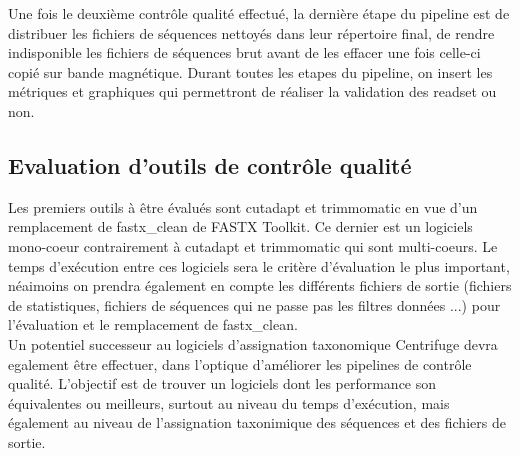 Une fois le deuxième contrôle qualité effectué, la dernière étape du pipeline est de distribuer les fichiers de séquences nettoyés dans leur répertoire final, de rendre indisponible les fichiers de séquences brut avant de les effacer une fois celle-ci copié sur bande magnétique. Durant toutes les etapes du pipeline, on insert les métriques et graphiques qui permettront de réaliser la validation des readset ou non.

\subsection{Evaluation d'outils de contrôle qualité}
Les premiers outils à être évalués sont cutadapt et trimmomatic en vue d'un remplacement de fastx\_clean de FASTX Toolkit. Ce dernier est un logiciels mono-coeur contrairement à cutadapt et trimmomatic qui sont multi-coeurs. Le temps d'exécution entre ces logiciels sera le critère d'évaluation le plus important, néaimoins on prendra également en compte les différents fichiers de sortie (fichiers de statistiques, fichiers de séquences qui ne passe pas les filtres données ...) pour l'évaluation et le remplacement de fastx\_clean.\\

Un potentiel successeur au logiciels d'assignation taxonomique Centrifuge devra egalement être effectuer, dans l'optique d'améliorer les pipelines de contrôle qualité. L'objectif est de trouver un logiciels dont les performance son équivalentes ou meilleurs, surtout au niveau du temps d'exécution, mais également au niveau de l'assignation taxonimique des séquences et des fichiers de sortie.